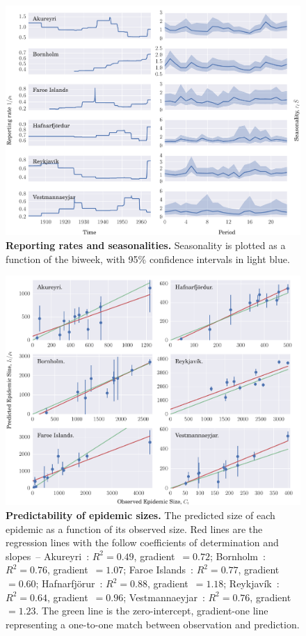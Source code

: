\documentclass[10pt]{article}
\begin{document}
\begin{figure}[!h]
\centering
\includegraphics[width=\textwidth]{figures/q2.pdf}
\caption{\textbf{Reporting rates and seasonalities.} Seasonality is plotted as a function of the biweek, with 95\% confidence intervals in light blue.}
\label{figSims}
\end{figure}


\begin{figure}[!h]
\centering
\includegraphics[width=\textwidth]{figures/q3.pdf}
\caption{\textbf{Predictability of epidemic sizes.} The predicted size of each epidemic as a function of its observed size. Red lines are the regression lines with the follow coefficients of determination and slopes~-- Akureyri~: $R^2 = 0.49$, gradient~$=0.72$; Bornholm~: $R^2=0.76$, gradient~$=1.07$; Faroe Islands~: $R^2=0.77$, gradient~$=0.60$; Hafnarfj\"{o}r\dh{}ur~: $R^2=0.88$, gradient~$=1.18$; Reykjav\'{i}k~: $R^2=0.64$, gradient~$=0.96$; Vestmannaeyjar~: $R^2=0.76$, gradient~$=1.23$. The green line is the zero-intercept, gradient-one line representing a one-to-one match between observation and prediction.}
\label{fig_sizes}
\end{figure}
\end{document}
